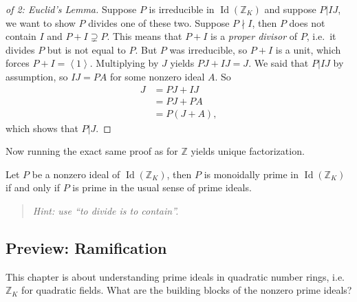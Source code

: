 \begin{proof}[of 2: Euclid's Lemma]

Suppose \(P\) is irreducible in \(\operatorname{Id}({\mathbb{Z}}_K)\)
and suppose \(P \mathrel{\Big|}IJ\), we want to show \(P\) divides one
of these two. Suppose \(P\nmid I\), then \(P\) does not contain \(I\)
and \(P+I \supsetneq P\). This means that \(P+I\) is a \emph{proper
divisor} of \(P\), i.e.~it divides \(P\) but is not equal to \(P\). But
\(P\) was irreducible, so \(P+I\) is a unit, which forces
\(P + I = \left\langle{ 1 }\right\rangle\). Multiplying by \(J\) yields
\(PJ + IJ = J\). We said that \(P \mathrel{\Big|}IJ\) by assumption, so
\(IJ = PA\) for some nonzero ideal \(A\). So
\begin{align*}
J 
&= PJ + IJ \\
&= PJ + PA \\ 
&= P(J + A)
,\end{align*}
which shows that \(P\mathrel{\Big|}J\).

\end{proof}

\begin{remark}

Now running the exact same proof as for \({\mathbb{Z}}\) yields unique
factorization.

\end{remark}

\begin{exercise}[?]

Let \(P\) be a nonzero ideal of \(\operatorname{Id}({\mathbb{Z}}_K)\),
then \(P\) is monoidally prime in \(\operatorname{Id}({\mathbb{Z}}_K)\)
if and only if \(P\) is prime in the usual sense of prime ideals.

\begin{quote}
\emph{Hint: use ``to divide is to contain''.}
\end{quote}

\end{exercise}

\hypertarget{preview-ramification}{%
\subsection{Preview: Ramification}\label{preview-ramification}}

\begin{remark}

This chapter is about understanding prime ideals in quadratic number
rings, i.e.~\({\mathbb{Z}}_K\) for quadratic fields. What are the
building blocks of the nonzero prime ideals?

\end{remark}

